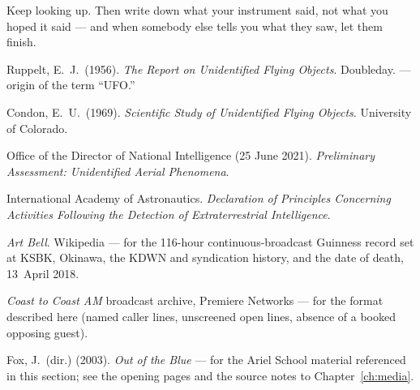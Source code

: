 Keep looking up. Then write down what your instrument said, not what you hoped it
said --- and when somebody else tells you what they saw, let them finish.

\vspace{14pt}

\begin{srcnotes}
\item Ruppelt, E.\ J.\ (1956). \emph{The Report on Unidentified Flying Objects}. Doubleday. --- origin of the term ``UFO.''
\item Condon, E.\ U.\ (1969). \emph{Scientific Study of Unidentified Flying Objects}. University of Colorado.
\item Office of the Director of National Intelligence (25 June 2021). \emph{Preliminary Assessment: Unidentified Aerial Phenomena}.
\item International Academy of Astronautics. \emph{Declaration of Principles Concerning Activities Following the Detection of Extraterrestrial Intelligence}.
\item \emph{Art Bell}. Wikipedia --- for the 116-hour continuous-broadcast Guinness record set at KSBK,
Okinawa, the KDWN and syndication history, and the date of death, 13~April 2018.
\item \emph{Coast to Coast AM} broadcast archive, Premiere Networks --- for the format described here
(named caller lines, unscreened open lines, absence of a booked opposing guest).
\item Fox, J.\ (dir.) (2003). \emph{Out of the Blue} --- for the Ariel School material referenced in
this section; see the opening pages and the source notes to Chapter~\ref{ch:media}.
\end{srcnotes}
